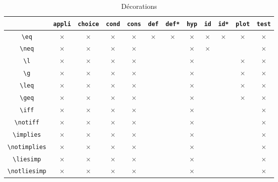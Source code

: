 \documentclass[12pt,a4paper]{article}
\newcommand\env[1]{\texttt{#1}}
\newcommand\macro[1]{\env{\textbackslash{}#1}}
\theoremstyle{definition}
\begin{document}
\begin{table}[h]
    \caption{Décorations}
    \begin{center}
        \begin{tabular}{c|c|c|c|c|c|c|c|c|c|c|c}
              & \verb+appli+ & \verb+choice+ & \verb+cond+ & \verb+cons+ & \verb+def+ & \verb+def*+ & \verb+hyp+ & \verb+id+ & \verb+id*+ & \verb+plot+ & \verb+test+ \\
            \hline \macro{eq} & $\times$ & $\times$ & $\times$ & $\times$ & $\times$ & $\times$ & $\times$ & $\times$ & $\times$ & $\times$ & $\times$ \\
            \hline \macro{neq} & $\times$ & $\times$ & $\times$ & $\times$ &          &          & $\times$ & $\times$ &          &          & $\times$ \\
            \hline \macro{l} & $\times$ & $\times$ & $\times$ & $\times$ &          &          & $\times$ &          &          & $\times$ & $\times$ \\
            \hline \macro{g} & $\times$ & $\times$ & $\times$ & $\times$ &          &          & $\times$ &          &          & $\times$ & $\times$ \\
            \hline \macro{leq} & $\times$ & $\times$ & $\times$ & $\times$ &          &          & $\times$ &          &          & $\times$ & $\times$ \\
            \hline \macro{geq} & $\times$ & $\times$ & $\times$ & $\times$ &          &          & $\times$ &          &          & $\times$ & $\times$ \\
            \hline \macro{iff} & $\times$ & $\times$ & $\times$ & $\times$ &          &          & $\times$ &          &          &          & $\times$ \\
            \hline \macro{notiff} & $\times$ & $\times$ & $\times$ & $\times$ &          &          & $\times$ &          &          &          & $\times$ \\
            \hline \macro{implies} & $\times$ & $\times$ & $\times$ & $\times$ &          &          & $\times$ &          &          &          & $\times$ \\
            \hline \macro{notimplies} & $\times$ & $\times$ & $\times$ & $\times$ &          &          & $\times$ &          &          &          & $\times$ \\
            \hline \macro{liesimp} & $\times$ & $\times$ & $\times$ & $\times$ &          &          & $\times$ &          &          &          & $\times$ \\
            \hline \macro{notliesimp} & $\times$ & $\times$ & $\times$ & $\times$ &          &          & $\times$ &          &          &          & $\times$ \\
        \end{tabular}
    \end{center}
    \label{table:decorations-operators}
\end{table}
\end{document}
